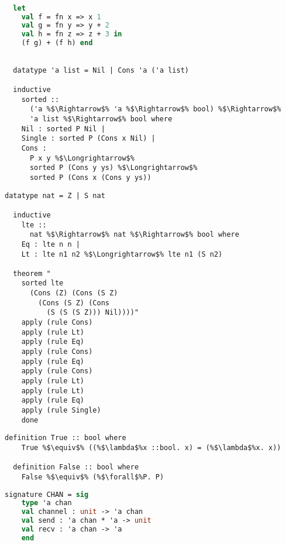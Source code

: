 \documentclass{article}
\begin{document}
\begin{lstlisting}[language=ML, style=codestyle1]

  let 
    val f = fn x => x 1
    val g = fn y => y + 2
    val h = fn z => z + 3 in 
    (f g) + (f h) end

\end{lstlisting}


\begin{lstlisting}[style=codestyle1, escapechar=\%]

  datatype 'a list = Nil | Cons 'a ('a list)

  inductive
    sorted ::
      ('a %$\Rightarrow$% 'a %$\Rightarrow$% bool) %$\Rightarrow$%
      'a list %$\Rightarrow$% bool where
    Nil : sorted P Nil |
    Single : sorted P (Cons x Nil) |
    Cons :
      P x y %$\Longrightarrow$%
      sorted P (Cons y ys) %$\Longrightarrow$%
      sorted P (Cons x (Cons y ys))
  \end{lstlisting}


\begin{lstlisting}[style=codestyle1, escapechar=\%]
  datatype nat = Z | S nat 

  inductive
    lte ::
      nat %$\Rightarrow$% nat %$\Rightarrow$% bool where
    Eq : lte n n |
    Lt : lte n1 n2 %$\Longrightarrow$% lte n1 (S n2)

  theorem "
    sorted lte
      (Cons (Z) (Cons (S Z)
        (Cons (S Z) (Cons
          (S (S (S Z))) Nil))))"
    apply (rule Cons)
    apply (rule Lt)
    apply (rule Eq)
    apply (rule Cons)
    apply (rule Eq)
    apply (rule Cons)
    apply (rule Lt)
    apply (rule Lt)
    apply (rule Eq)
    apply (rule Single)
    done
  \end{lstlisting}

\begin{lstlisting}[style=codestyle1, escapechar=\%]
  definition True :: bool where 
    True %$\equiv$% ((%$\lambda$%x ::bool. x) = (%$\lambda$%x. x))

  definition False :: bool where 
    False %$\equiv$% (%$\forall$%P. P)

  \end{lstlisting}

\begin{lstlisting}[language=ML, style=codestyle1]
  signature CHAN = sig
    type 'a chan 
    val channel : unit -> 'a chan
    val send : 'a chan * 'a -> unit
    val recv : 'a chan -> 'a
    end     
\end{lstlisting}
\end{document}
